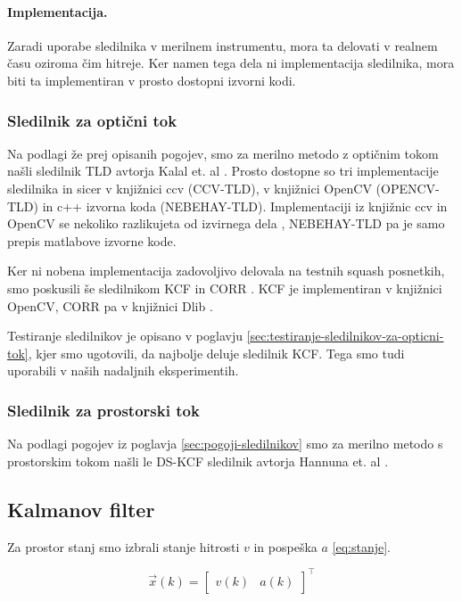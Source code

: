 \paragraph{Implementacija.} Zaradi uporabe sledilnika v merilnem instrumentu, mora ta delovati v realnem času oziroma čim hitreje. Ker namen tega dela ni implementacija sledilnika, mora biti ta implementiran v prosto dostopni izvorni kodi. 


\subsubsection{Sledilnik za optični tok}
Na podlagi že prej opisanih pogojev, smo za merilno metodo z optičnim tokom našli sledilnik TLD avtorja Kalal et. al \cite{kalal2012tracking}. Prosto dostopne so tri implementacije sledilnika in sicer v knjižnici ccv (CCV-TLD), v knjižnici OpenCV (OPENCV-TLD) in c++ izvorna koda (NEBEHAY-TLD). Implementaciji iz knjižnic ccv in OpenCV se nekoliko razlikujeta od izvirnega dela \cite{kalal2012tracking}, NEBEHAY-TLD pa je samo prepis matlabove izvorne kode. 

Ker ni nobena implementacija zadovoljivo delovala na testnih squash posnetkih, smo poskusili še sledilnikom KCF \cite{danelljan2014adaptive} in CORR \cite{danelljan2014accurate}. KCF je implementiran v knjižnici OpenCV, CORR pa v knjižnici Dlib \cite{king2009dlib}.

Testiranje sledilnikov je opisano v poglavju \ref{sec:testiranje-sledilnikov-za-opticni-tok}, kjer smo ugotovili, da najbolje deluje sledilnik KCF. Tega smo tudi uporabili v naših nadaljnih eksperimentih.

\subsubsection{Sledilnik za prostorski tok}
Na podlagi pogojev iz poglavja \ref{sec:pogoji-sledilnikov} smo za merilno metodo s prostorskim tokom našli le DS-KCF sledilnik avtorja Hannuna et. al \cite{hannuna2016ds}. 

\subsection{Kalmanov filter}
Za prostor stanj smo izbrali stanje hitrosti $v$ in pospeška $a$ \eqref{eq:stanje}. 

\begin{equation}
\vec{x}(k) = \begin{bmatrix}
					v(k) & a(k)
				\end{bmatrix}^\top 
                \label{eq:stanje}
\end{equation}

